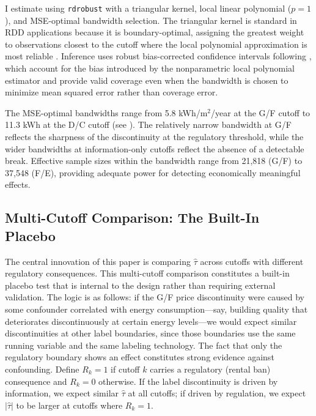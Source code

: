 \documentclass[12pt]{article}
\begin{document}
I estimate  using \texttt{rdrobust} \citep{calonico2014robust, calonico2020optimal} with a triangular kernel, local linear polynomial ($p=1$), and MSE-optimal bandwidth selection. The triangular kernel is standard in RDD applications because it is boundary-optimal, assigning the greatest weight to observations closest to the cutoff where the local polynomial approximation is most reliable \citep{cattaneo2019rdr}. Inference uses robust bias-corrected confidence intervals following \citet{cattaneo2020rdrobust}, which account for the bias introduced by the nonparametric local polynomial estimator and provide valid coverage even when the bandwidth is chosen to minimize mean squared error rather than coverage error.

The MSE-optimal bandwidths range from 5.8 kWh/m$^2$/year at the G/F cutoff to 11.3 kWh at the D/C cutoff (see ). The relatively narrow bandwidth at G/F reflects the sharpness of the discontinuity at the regulatory threshold, while the wider bandwidths at information-only cutoffs reflect the absence of a detectable break. Effective sample sizes within the bandwidth range from 21,818 (G/F) to 37,548 (F/E), providing adequate power for detecting economically meaningful effects.

\subsection{Multi-Cutoff Comparison: The Built-In Placebo}

The central innovation of this paper is comparing $\hat{\tau}$ across cutoffs with different regulatory consequences. This multi-cutoff comparison constitutes a built-in placebo test that is internal to the design rather than requiring external validation. The logic is as follows: if the G/F price discontinuity were caused by some confounder correlated with energy consumption---say, building quality that deteriorates discontinuously at certain energy levels---we would expect similar discontinuities at other label boundaries, since those boundaries use the same running variable and the same labeling technology. The fact that only the regulatory boundary shows an effect constitutes strong evidence against confounding. Define $R_k = 1$ if cutoff $k$ carries a regulatory (rental ban) consequence and $R_k = 0$ otherwise. If the label discontinuity is driven by information, we expect similar $\hat{\tau}$ at all cutoffs; if driven by regulation, we expect $|\hat{\tau}|$ to be larger at cutoffs where $R_k = 1$.
\end{document}
